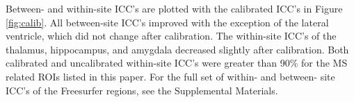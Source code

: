 Between- and within-site ICC's are plotted with the calibrated ICC's in Figure \ref{fig:calib}. All between-site ICC's improved with the exception of the lateral ventricle, which did not change after calibration. The within-site ICC's of the thalamus, hippocampus, and amygdala decreased slightly after calibration. Both calibrated and uncalibrated within-site ICC's were greater than 90\% for the MS related ROIs listed in this paper. For the full set of within- and between- site ICC's of the Freesurfer regions, see the Supplemental Materials.